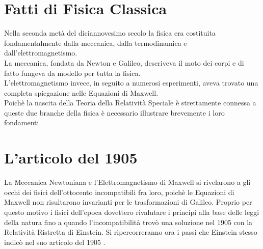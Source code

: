 \documentclass[12pt,a4paper]{report}
\numberwithin{equation}{section}
\begin{document}




\tableofcontents



\chapter{Fatti di Fisica Classica}
Nella seconda metà del diciannovesimo secolo la fisica era costituita fondamentalmente dalla meccanica, 
dalla termodinamica e dall'elettromagnetismo.\\ La meccanica, fondata da Newton e Galileo, descriveva il 
moto dei corpi e di fatto fungeva da modello per tutta la fisica.\\L'elettromagnetismo invece, in seguito 
a numerosi esperimenti, aveva trovato una completa spiegazione nelle Equazioni di Maxwell.\\
Poichè la nascita della Teoria della Relatività Speciale è strettamente connessa a queste due branche della fisica 
è necessario illustrare brevemente i loro fondamenti. 





\chapter{L'articolo del 1905}
La Meccanica Newtoniana e l'Elettromagnetismo di Maxwell si rivelarono a gli occhi dei fisici dell'ottocento 
incompatibili fra loro, 
poichè le Equazioni di Maxwell non risultarono invarianti per le trasformazioni di Galileo. 
Proprio per questo motivo i fisici dell'epoca dovettero rivalutare i principi alla base delle leggi 
della natura fino a quando l'incompatibilità trovò una soluzione nel 1905 con la Relatività Ristretta di Einstein.
 Si ripercorreranno ora i passi che Einstein stesso indicò nel suo articolo del 1905 \cite{Einstein1905}.




\appendix




\end{document}

